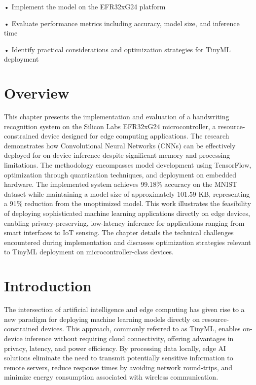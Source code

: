 \documentclass[
  9pt,
  letterpaper,
  abstract,
  titlepage]{scrbook}
\begin{document}
• Implement the model on the EFR32xG24 platform

• Evaluate performance metrics including accuracy, model size, and
inference time

• Identify practical considerations and optimization strategies for
TinyML deployment

\section{Overview}\label{overview-1}

This chapter presents the implementation and evaluation of a handwriting
recognition system on the Silicon Labs EFR32xG24 microcontroller, a
resource-constrained device designed for edge computing applications.
The research demonstrates how Convolutional Neural Networks (CNNs) can
be effectively deployed for on-device inference despite significant
memory and processing limitations. The methodology encompasses model
development using TensorFlow, optimization through quantization
techniques, and deployment on embedded hardware. The implemented system
achieves 99.18\% accuracy on the MNIST dataset while maintaining a model
size of approximately 101.59 KB, representing a 91\% reduction from the
unoptimized model. This work illustrates the feasibility of deploying
sophisticated machine learning applications directly on edge devices,
enabling privacy-preserving, low-latency inference for applications
ranging from smart interfaces to IoT sensing. The chapter details the
technical challenges encountered during implementation and discusses
optimization strategies relevant to TinyML deployment on
microcontroller-class devices.

\section{Introduction}\label{introduction}

The intersection of artificial intelligence and edge computing has given
rise to a new paradigm for deploying machine learning models directly on
resource-constrained devices. This approach, commonly referred to as
TinyML, enables on-device inference without requiring cloud
connectivity, offering advantages in privacy, latency, and power
efficiency. By processing data locally, edge AI solutions eliminate the
need to transmit potentially sensitive information to remote servers,
reduce response times by avoiding network round-trips, and minimize
energy consumption associated with wireless communication.
\end{document}
